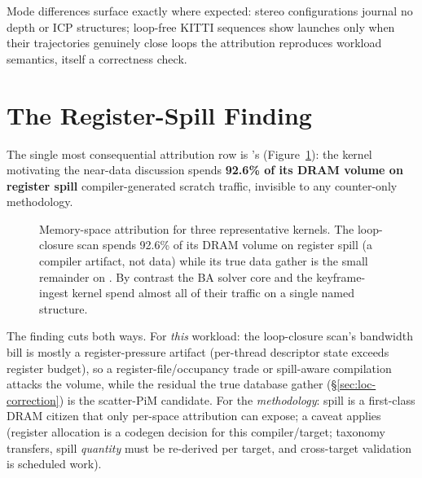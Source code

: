 Mode differences surface exactly where expected: stereo configurations journal no depth or ICP structures; loop-free KITTI sequences show \stTrack{} launches only when their trajectories genuinely close loops the attribution reproduces workload semantics, itself a correctness check.

\section{The Register-Spill Finding}
\label{sec:attr-spill}

The single most consequential attribution row is \stTrack{}'s (Figure~\ref{fig:attrib}): the kernel motivating the near-data discussion spends \textbf{92.6\% of its DRAM volume on register spill} compiler-generated scratch traffic, invisible to any counter-only methodology.

\begin{figure}[t]
\centering
{}
\caption[Per-kernel memory-space attribution.]{Memory-space attribution for three
representative kernels. The loop-closure scan \stTrack{} spends 92.6\% of its DRAM
volume on register spill (a compiler artifact, not data) while its true data
gather is the small remainder on . By contrast the BA
solver core and the keyframe-ingest kernel spend almost all of their traffic on a
single named structure.}
\label{fig:attrib}
\end{figure} The finding cuts both ways. For \emph{this} workload: the loop-closure scan’s bandwidth bill is mostly a register-pressure artifact (per-thread descriptor state exceeds register budget), so a register-file/occupancy trade or spill-aware compilation attacks the volume, while the residual the true database gather (\S\ref{sec:loc-correction}) is the scatter-PiM candidate. For the \emph{methodology}: spill is a first-class DRAM citizen that only per-space attribution can expose; a caveat applies (register allocation is a codegen decision for this compiler/target; taxonomy transfers, spill \emph{quantity} must be re-derived per target, and cross-target validation is scheduled work).

